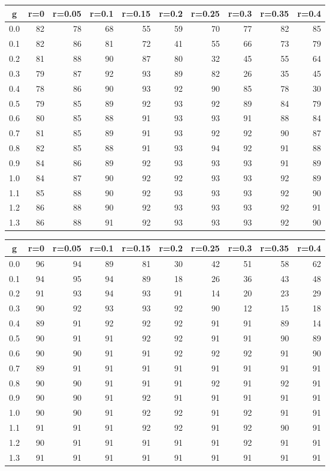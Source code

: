 %
\begin{table}[!tbp]
 \begin{center}
 \begin{tabular}{rrrrrrrrrr}\hline\hline
\multicolumn{1}{c}{g}&\multicolumn{1}{c}{r=0}&\multicolumn{1}{c}{r=0.05}&\multicolumn{1}{c}{r=0.1}&\multicolumn{1}{c}{r=0.15}&\multicolumn{1}{c}{r=0.2}&\multicolumn{1}{c}{r=0.25}&\multicolumn{1}{c}{r=0.3}&\multicolumn{1}{c}{r=0.35}&\multicolumn{1}{c}{r=0.4}\tabularnewline
\hline
0.0&82&78&68&55&59&70&77&82&85\tabularnewline
0.1&82&86&81&72&41&55&66&73&79\tabularnewline
0.2&81&88&90&87&80&32&45&55&64\tabularnewline
0.3&79&87&92&93&89&82&26&35&45\tabularnewline
0.4&78&86&90&93&92&90&85&78&30\tabularnewline
0.5&79&85&89&92&93&92&89&84&79\tabularnewline
0.6&80&85&88&91&93&93&91&88&84\tabularnewline
0.7&81&85&89&91&93&92&92&90&87\tabularnewline
0.8&82&85&88&91&93&94&92&91&88\tabularnewline
0.9&84&86&89&92&93&93&93&91&89\tabularnewline
1.0&84&87&90&92&92&93&93&92&89\tabularnewline
1.1&85&88&90&92&93&93&93&92&90\tabularnewline
1.2&86&88&90&92&93&93&93&92&91\tabularnewline
1.3&86&88&91&92&93&93&93&92&90\tabularnewline
\hline
\end{tabular}

\end{center}

\end{table}

%
\begin{table}[!tbp]
 \begin{center}
 \begin{tabular}{rrrrrrrrrr}\hline\hline
\multicolumn{1}{c}{g}&\multicolumn{1}{c}{r=0}&\multicolumn{1}{c}{r=0.05}&\multicolumn{1}{c}{r=0.1}&\multicolumn{1}{c}{r=0.15}&\multicolumn{1}{c}{r=0.2}&\multicolumn{1}{c}{r=0.25}&\multicolumn{1}{c}{r=0.3}&\multicolumn{1}{c}{r=0.35}&\multicolumn{1}{c}{r=0.4}\tabularnewline
\hline
0.0&96&94&89&81&30&42&51&58&62\tabularnewline
0.1&94&95&94&89&18&26&36&43&48\tabularnewline
0.2&91&93&94&93&91&14&20&23&29\tabularnewline
0.3&90&92&93&93&92&90&12&15&18\tabularnewline
0.4&89&91&92&92&92&91&91&89&14\tabularnewline
0.5&90&91&91&92&92&91&91&90&89\tabularnewline
0.6&90&90&91&91&92&92&92&91&90\tabularnewline
0.7&89&91&91&91&91&91&91&91&91\tabularnewline
0.8&90&90&91&91&91&92&91&92&91\tabularnewline
0.9&90&90&91&92&91&91&91&91&91\tabularnewline
1.0&90&90&91&92&92&91&92&91&91\tabularnewline
1.1&91&91&91&92&92&91&92&90&91\tabularnewline
1.2&90&91&91&91&91&91&92&91&91\tabularnewline
1.3&91&91&91&91&91&91&91&91&91\tabularnewline
\hline
\end{tabular}

\end{center}

\end{table}

